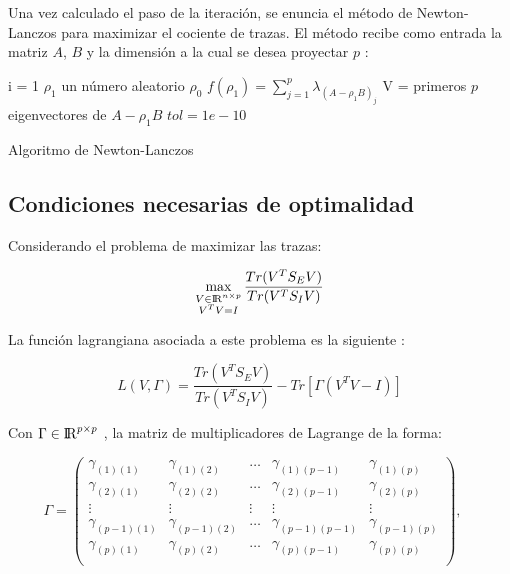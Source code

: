 Una vez calculado el paso de la iteración, se enuncia el método de Newton-Lanczos para maximizar el cociente de trazas. El método recibe como entrada la matriz $A$, $B$ y la dimensión a la cual se desea proyectar $p$ \cite{ngo2012trace}: 

\begin{algorithm}[H]
i = 1\;
$\rho_1$ un número aleatorio\;
$\rho_0$\;
$f(\rho_1) = \sum\limits_{j = 1}^{p} \lambda_{(A-\rho_1 B)_j}$\;
V = primeros $p$ eigenvectores de $A-\rho_1 B$\;
$tol = 1e-10$\;

 \caption{Algoritmo de Newton-Lanczos}
\end{algorithm}


\subsection{Condiciones necesarias de optimalidad}
Considerando el problema de maximizar las trazas:

\begin{equation}\label{eq:3.12}
  \max_{\substack{V \in {\rm I\!R}^{n \times p} \\ V^TV = I}} \frac{Tr(V^T S_E V)}{Tr(V^T S_I V)} 
\end{equation}

La función lagrangiana asociada a este problema es la siguiente \cite{ngo2012trace}:

\begin{equation*}
L(V, \Gamma) =  \frac{Tr(V^T S_E V)}{Tr(V^T S_I V)} - Tr[\Gamma(V^TV-I)]
\end{equation*}

Con $\Gamma \in {\rm I\!R}^{p \times p}$ , la matriz de multiplicadores de Lagrange de la forma:

\begin{equation*}
\Gamma = \left(\!
    \begin{array}{ccccc}
    \gamma_{(1)(1)} & \gamma_{(1)(2)} & \hdots & \gamma_{(1)(p-1)} & \gamma_{(1)(p)} \\
    \gamma_{(2)(1)} & \gamma_{(2)(2)} & \hdots & \gamma_{(2)(p-1)} & \gamma_{(2)(p)} \\
    \vdots & \vdots & \vdots & \vdots & \vdots \\
    \gamma_{(p-1)(1)} & \gamma_{(p-1)(2)} & \hdots & \gamma_{(p-1)(p-1)} & \gamma_{(p-1)(p)} \\
    \gamma_{(p)(1)} & \gamma_{(p)(2)} & \hdots & \gamma_{(p)(p-1)} & \gamma_{(p)(p)} \\
\end{array}
  \!\right), \quad
\end{equation*}



